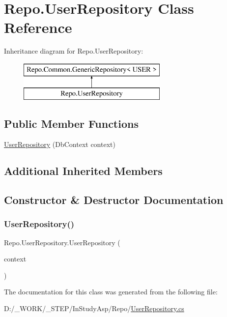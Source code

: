 \hypertarget{class_repo_1_1_user_repository}{}\section{Repo.\+User\+Repository Class Reference}
\label{class_repo_1_1_user_repository}
Inheritance diagram for Repo.\+User\+Repository\+:\begin{figure}[H]
\begin{center}
\leavevmode
\includegraphics[height=2.000000cm]{class_repo_1_1_user_repository}
\end{center}
\end{figure}
\subsection*{Public Member Functions}
\begin{DoxyCompactItemize}
\item 
\hyperlink{class_repo_1_1_user_repository_ae1b1d6c1aa7578a0a280f4b457f5ffdf}{User\+Repository} (Db\+Context context)
\end{DoxyCompactItemize}
\subsection*{Additional Inherited Members}


\subsection{Constructor \& Destructor Documentation}
\mbox{\label{class_repo_1_1_user_repository_ae1b1d6c1aa7578a0a280f4b457f5ffdf}} 
\subsubsection{\texorpdfstring{User\+Repository()}{UserRepository()}}
{\footnotesize\ttfamily Repo.\+User\+Repository.\+User\+Repository (\begin{DoxyParamCaption}\item[{Db\+Context}]{context }\end{DoxyParamCaption})}



The documentation for this class was generated from the following file\+:\begin{DoxyCompactItemize}
\item 
D\+:/\+\_\+\+W\+O\+R\+K/\+\_\+\+S\+T\+E\+P/\+In\+Study\+Asp/\+Repo/\hyperlink{_user_repository_8cs}{User\+Repository.\+cs}\end{DoxyCompactItemize}
